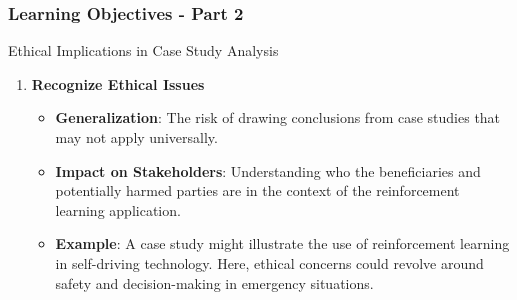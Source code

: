 \documentclass[aspectratio=169]{beamer}
\begin{document}
\begin{frame}[fragile]
    \frametitle{Learning Objectives - Part 2}
    \begin{block}{Ethical Implications in Case Study Analysis}
        \begin{enumerate}
            \item \textbf{Recognize Ethical Issues}
                \begin{itemize}
                    \item \textbf{Generalization}: The risk of drawing conclusions from case studies that may not apply universally.
                    \item \textbf{Impact on Stakeholders}: Understanding who the beneficiaries and potentially harmed parties are in the context of the reinforcement learning application.

                    \item \textbf{Example}: A case study might illustrate the use of reinforcement learning in self-driving technology. Here, ethical concerns could revolve around safety and decision-making in emergency situations.
                \end{itemize}
        \end{enumerate}
    \end{block}
\end{frame}
\end{document}
